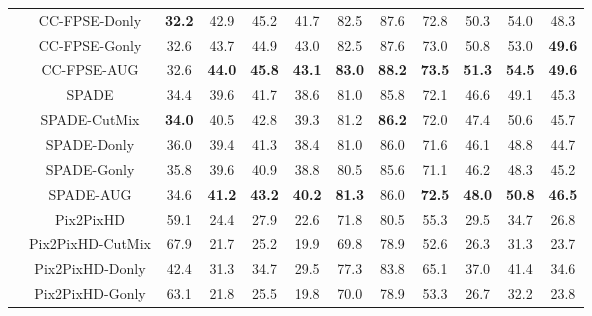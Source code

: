 \documentclass[final]{cvpr}
\newcommand\+{\mkern4mu}
\begin{document}
\begin{table*}[h]
{\begin{tabular}{@{}lc@{\hspace{0.3cm}}c@{\hspace{0.7cm}}ccc@{\hspace{0.7cm}}ccc@{\hspace{0.7cm}}ccc@{}}
			& \small CC-FPSE-Donly & \small \textbf{32.2} & \small	42.9 & \small	45.2 & \small	41.7 & \small	82.5 & \small	87.6 & \small	72.8 & \small	50.3 & \small	54.0 & \small	48.3 \tabularnewline	
			& \small CC-FPSE-Gonly & \small 32.6 & \small	43.7 & \small	44.9 & \small	43.0 & \small	82.5 & \small	87.6 & \small	73.0 & \small	50.8 & \small	53.0 & \small \textbf{49.6} \tabularnewline	
			
			& \small CC-FPSE-AUG & \small 32.6 & \small \textbf{44.0} & \small \textbf{45.8} & \small \textbf{43.1} & \small \textbf{83.0} & \small \textbf{88.2} & \small \textbf{73.5} & \small \textbf{51.3} & \small \textbf{54.5} & \small \textbf{49.6} \tabularnewline[0.2cm] 
			
			


			& \small SPADE & \small 34.4 & \small 39.6 & \small 41.7 & \small 38.6 & \small 81.0 & \small 85.8 & \small 72.1 & \small 46.6 & \small 49.1 & \small 45.3 \tabularnewline
			
			& \small SPADE-CutMix & \small \textbf{34.0} & \small 40.5 & \small 42.8 & \small 39.3 & \small 81.2 & \small \textbf{86.2} & \small 72.0 & \small 47.4 & \small 50.6 & \small 45.7 \tabularnewline
			
			& \small SPADE-Donly & \small 36.0 & \small	39.4 & \small	41.3 & \small	38.4 & \small	81.0 & \small	86.0 & \small	71.6 & \small	46.1 & \small	48.8 & \small	44.7 \tabularnewline
			& \small SPADE-Gonly & \small 35.8 & \small	39.6 & \small 40.9 & \small	38.8 & \small 80.5 & \small	85.6 & \small 71.1 & \small	46.2 & \small 48.3 & \small 45.2 \tabularnewline
			
			& \small SPADE-AUG & \small 34.6 & \small \textbf{41.2} & \small \textbf{43.2} & \small \textbf{40.2} & \small \textbf{81.3} & \small 86.0 & \small \textbf{72.5} & \small \textbf{48.0} & \small \textbf{50.8} & \small \textbf{46.5} \tabularnewline[0.2cm] 
			


			& \small Pix2PixHD & \small 59.1 & \small 24.4 & \small 27.9 & \small 22.6 & \small 71.8 & \small 80.5 & \small 55.3 & \small 29.5 & \small 34.7 & \small 26.8 \tabularnewline
			
			& \small Pix2PixHD-CutMix & \small 67.9 & \small 21.7 & \small 25.2 & \small 19.9 & \small 69.8 & \small 78.9 & \small 52.6 & \small 26.3 & \small 31.3 & \small	23.7 \tabularnewline
			
			& \small Pix2PixHD-Donly & \small 42.4 & \small	31.3 & \small 34.7 & \small	29.5 & \small 77.3 & \small	83.8 & \small 65.1 & \small	37.0 & \small 41.4 & \small	34.6 \tabularnewline
			& \small Pix2PixHD-Gonly & \small 63.1 & \small	21.8 & \small 25.5 & \small	19.8 & \small 70.0 & \small	78.9 & \small 53.3 & \small	26.7 & \small 32.2 & \small	23.8 \tabularnewline
			

\end{tabular}}
\end{table*}
\end{document}
